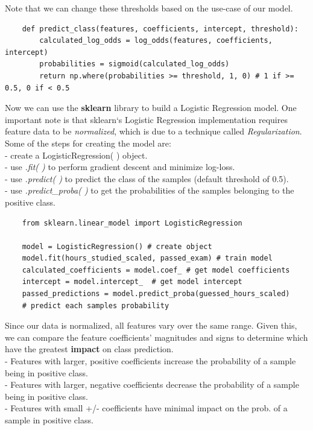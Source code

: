 \documentclass[11pt, a4paper]{article}
\begin{document}
\begin{spacing}{1.1}
	Note that we can change these thresholds based on the use-case of our model.
	\begin{lstlisting}
	def predict_class(features, coefficients, intercept, threshold):
		calculated_log_odds = log_odds(features, coefficients, intercept)
		probabilities = sigmoid(calculated_log_odds)
		return np.where(probabilities >= threshold, 1, 0) # 1 if >= 0.5, 0 if < 0.5	\end{lstlisting} \vspace*{1mm}
	Now we can use the \textbf{sklearn} library to build a Logistic Regression model. One important note is that sklearn‘s Logistic Regression implementation requires feature data to be \textit{normalized}, which is due to a technique called \textit{Regularization}. Some of the steps for creating the model are: \\
	\hspace*{3mm} - create a LogisticRegression( ) object. \\
	\hspace*{3mm} - use \textit{.fit( )} to perform gradient descent and minimize log-loss. \\
	\hspace*{3mm} - use \textit{.predict( )} to predict the class of the samples (default threshold of 0.5). \\
	\hspace*{3mm} - use \textit{.predict\_proba( )} to get the probabilities of the samples belonging to the positive class. 
	\begin{lstlisting}
	from sklearn.linear_model import LogisticRegression
	
	model = LogisticRegression() # create object
	model.fit(hours_studied_scaled, passed_exam) # train model
	calculated_coefficients = model.coef_ # get model coefficients
	intercept = model.intercept_  # get model intercept
	passed_predictions = model.predict_proba(guessed_hours_scaled) 
	# predict each samples probability	\end{lstlisting} \vspace*{1mm}
	Since our data is normalized, all features vary over the same range. Given this, we can compare the feature coefficients’ magnitudes and signs to determine which have the greatest \textbf{impact} on class prediction. \\
	\hspace*{3mm} - Features with larger, positive coefficients increase the probability of a sample being in positive class.\\	
	\hspace*{3mm} - Features with larger, negative coefficients decrease the probability of a sample being in positive class.\\
	\hspace*{3mm} - Features with small +/- coefficients have minimal impact on the prob. of a sample in positive class.\newpage


\end{spacing}
\end{document}
